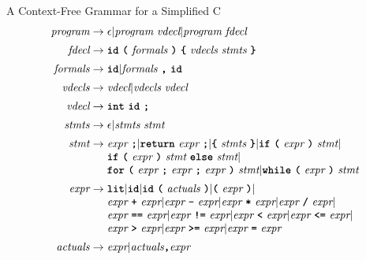 \documentclass{plt}
\begin{document}
\begin{frame}{A Context-Free Grammar for a Simplified C}
\small
\[
\begin{array}{r@{\hspace{3pt}}c@{\hspace{3pt}}l}
\textit{program} & \rightarrow & \epsilon |
   \textit{program}\ \textit{vdecl} |
   \textit{program}\ \textit{fdecl} \\[5pt]
\textit{fdecl} & \rightarrow &
\tok{id}\ \tok{(}\ \textit{formals}\ \tok{)}\ \tok{\{}\ \textit{vdecls}\ \textit{stmts}\ \tok{\}}
\\[5pt]
\textit{formals} & \rightarrow & \tok{id} |
\textit{formals}\ \tok{,}\ \tok{id} \\[5pt]
\textit{vdecls} & \rightarrow & \textit{vdecl} | \textit{vdecls}\ \textit{vdecl} \\[5pt]
\textit{vdecl} & \rightarrow & \tok{int}\ \tok{id}\ \tok{;} \\[5pt]
\textit{stmts} & \rightarrow & \epsilon | \textit{stmts}\ \textit{stmt} \\[5pt]
\textit{stmt} & \rightarrow & \textit{expr}\ \tok{;} |
\tok{return}\ \textit{expr}\ \tok{;} |
\tok{\{}\ \textit{stmts}\ \tok{\}} |
\tok{if}\ \tok{(}\ \textit{expr}\ \tok{)}\ \textit{stmt} | \\&&
\tok{if}\ \tok{(}\ \textit{expr}\ \tok{)}\ \textit{stmt}\ \tok{else}\ \textit{stmt}
| \\&&
\tok{for}\ \tok{(}\ \textit{expr}\ \tok{;}\ \textit{expr}\ \tok{;}\ \textit{expr}\ \tok{)}\ \textit{stmt}
|
\tok{while}\ \tok{(}\ \textit{expr}\ \tok{)}\ \textit{stmt}
\\[5pt]
\textit{expr} & \rightarrow &
\tok{lit} | \tok{id} |
\tok{id}\ \tok{(}\ \textit{actuals}\ \tok{)} |
\tok{(}\ \textit{expr}\ \tok{)} | \\&&
\textit{expr}\ \tok{+}\ \textit{expr} |
\textit{expr}\ \tok{-}\ \textit{expr} |
\textit{expr}\ \tok{*}\ \textit{expr} |
\textit{expr}\ \tok{/}\ \textit{expr} | \\&&
\textit{expr}\ \tok{==}\ \textit{expr} |
\textit{expr}\ \tok{!=}\ \textit{expr} |
\textit{expr}\ \tok{<}\ \textit{expr} |
\textit{expr}\ \tok{<=}\ \textit{expr} |  \\&&
\textit{expr}\ \tok{>}\ \textit{expr} |
\textit{expr}\ \tok{>=}\ \textit{expr} |
\textit{expr}\ \tok{=}\ \textit{expr}
\\[5pt]
\textit{actuals} & \rightarrow & \textit{expr} | \textit{actuals}
\tok{,} \textit{expr} \\
\end{array}
\]

\end{frame}
\end{document}
